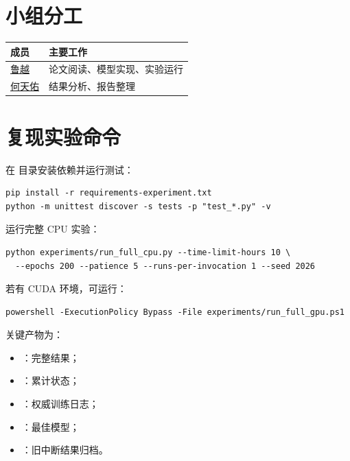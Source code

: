 \documentclass[UTF8,a4paper,12pt]{ctexart}
\begin{document}
\section*{小组分工}



\begin{table}[H]
  \centering
  \begin{tabularx}{\textwidth}{lX}
    \toprule
    成员 & 主要工作 \\
    \midrule
    \underline{鲁越} & 论文阅读、模型实现、实验运行 \\
    \underline{何天佑} & 结果分析、报告整理 \\
    \bottomrule
  \end{tabularx}
\end{table}

\appendix
\section{复现实验命令}

在  目录安装依赖并运行测试：
\begin{verbatim}
pip install -r requirements-experiment.txt
python -m unittest discover -s tests -p "test_*.py" -v
\end{verbatim}

运行完整 CPU 实验：
\begin{verbatim}
python experiments/run_full_cpu.py --time-limit-hours 10 \
  --epochs 200 --patience 5 --runs-per-invocation 1 --seed 2026
\end{verbatim}

若有 CUDA 环境，可运行：
\begin{verbatim}
powershell -ExecutionPolicy Bypass -File experiments/run_full_gpu.ps1
\end{verbatim}

关键产物为：
\begin{itemize}
  \item {}：完整结果；
  \item {}：累计状态；
  \item {}：权威训练日志；
  \item {}：最佳模型；
  \item {}：旧中断结果归档。
\end{itemize}
\end{document}

